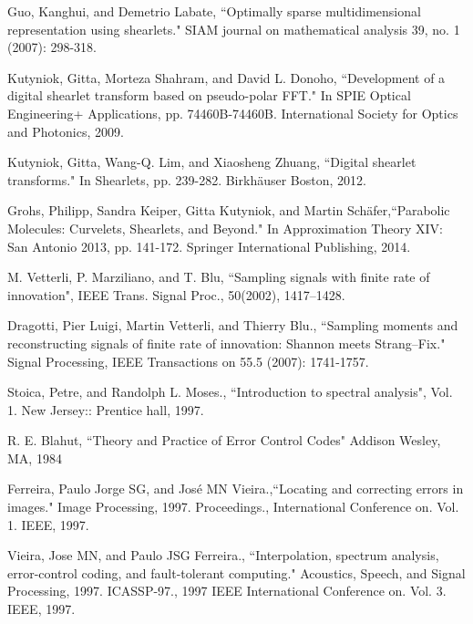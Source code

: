 \documentclass{UCF_ETD}
\begin{document}
\begin{thebibliography}{99}
Guo, Kanghui, and Demetrio Labate, ``Optimally sparse multidimensional representation using shearlets." SIAM journal on mathematical analysis 39, no. 1 (2007): 298-318.

Kutyniok, Gitta, Morteza Shahram, and David L. Donoho, ``Development of a digital shearlet transform based on pseudo-polar FFT." In SPIE Optical Engineering+ Applications, pp. 74460B-74460B. International Society for Optics and Photonics, 2009.

Kutyniok, Gitta, Wang-Q. Lim, and Xiaosheng Zhuang, ``Digital shearlet transforms." In Shearlets, pp. 239-282. Birkhäuser Boston, 2012.

Grohs, Philipp, Sandra Keiper, Gitta Kutyniok, and Martin Schäfer,``Parabolic Molecules: Curvelets, Shearlets, and Beyond." In Approximation Theory XIV: San Antonio 2013, pp. 141-172. Springer International Publishing, 2014.



M. Vetterli, P. Marziliano, and T. Blu, ``Sampling signals with ﬁnite rate of innovation", IEEE Trans. Signal Proc., 50(2002), 1417–1428.

Dragotti, Pier Luigi, Martin Vetterli, and Thierry Blu., ``Sampling moments and reconstructing signals of finite rate of innovation: Shannon meets Strang–Fix." Signal Processing, IEEE Transactions on 55.5 (2007): 1741-1757.

Stoica, Petre, and Randolph L. Moses., ``Introduction to spectral analysis", Vol. 1. New Jersey:: Prentice hall, 1997.

R. E. Blahut, ``Theory and Practice of Error Control Codes" Addison Wesley, MA, 1984

Ferreira, Paulo Jorge SG, and José MN Vieira.,``Locating and correcting errors in images." Image Processing, 1997. Proceedings., International Conference on. Vol. 1. IEEE, 1997.

Vieira, Jose MN, and Paulo JSG Ferreira., ``Interpolation, spectrum analysis, error-control coding, and fault-tolerant computing." Acoustics, Speech, and Signal Processing, 1997. ICASSP-97., 1997 IEEE International Conference on. Vol. 3. IEEE, 1997.


\end{thebibliography}
\end{document}
